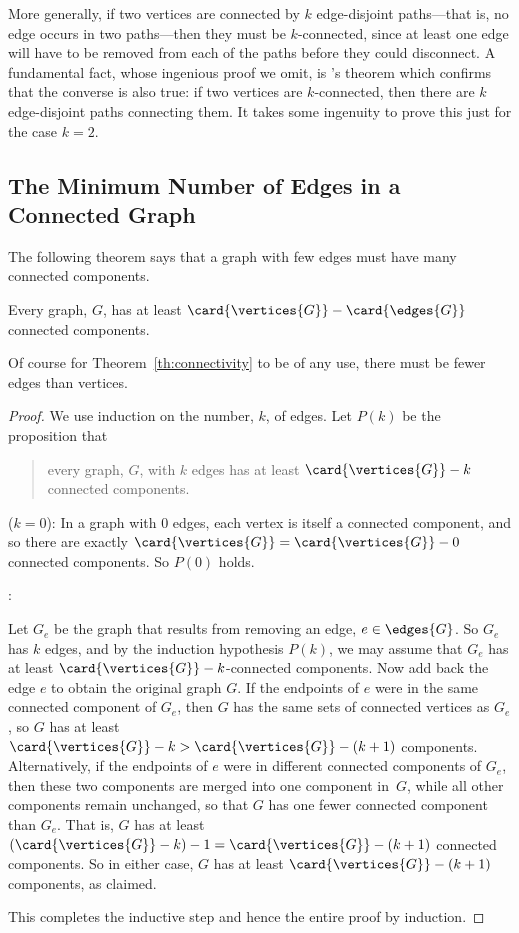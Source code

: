 More generally, if two vertices are connected by $k$ edge-disjoint
paths---that is, no edge occurs in two paths---then they must
be $k$-connected, since at least one edge will have to be removed from
each of the paths before they could disconnect.  A fundamental fact,
whose ingenious proof we omit, is 's theorem which
confirms that the converse is also true: if two vertices are
$k$-connected, then there are $k$ edge-disjoint paths connecting them.
It takes some ingenuity to prove this just for the case $k=2$.

\subsection{The Minimum Number of Edges in a Connected Graph}

The following theorem says that a graph with few edges must have many
connected components.
\begin{theorem}\label{th:connectivity}
Every graph, $G$, has at least $\card{\vertices{G}} - \card{\edges{G}}$
connected components.
\end{theorem}
Of course for Theorem~\ref{th:connectivity} to be of any use, there must
be fewer edges than vertices.

\begin{proof}
We use induction on the number, $k$, of edges.  Let $P(k)$ be the
proposition that
\begin{quote}
every graph, $G$, with $k$ edges has at least $\card{\vertices{G}}-k$
connected components.
\end{quote}

 ($k=0$): In a graph with 0 edges, each
vertex is itself a connected component, and so there are exactly
$\card{\vertices{G}} = \card{\vertices{G}} - 0$ connected components.
So $P(0)$ holds.

:

\iffalse
Now we assume that the induction hypothesis holds for every $k$-edge
graph in order to prove that it holds for every $(k+1)$-edge graph,
where $k \geq 0$.
\fi

Let $G_e$ be the graph that results from removing an edge, $e \in
\edges{G}$.  So $G_e$ has $k$ edges, and by the induction hypothesis
$P(k)$, we may assume that $G_e$ has at least $\card{\vertices{G}} -
k$-connected components.  Now add back the edge $e$ to obtain the
original graph $G$.  If the endpoints of $e$ were in the same
connected component of $G_e$, then $G$ has the same sets of connected
vertices as $G_e$, so $G$ has at least $\card{\vertices{G}} - k >
\card{\vertices{G}} - (k+1)$ components.  Alternatively, if the
endpoints of $e$ were in different connected components of $G_e$, then
these two components are merged into one component in~$G$, while all
other components remain unchanged, so that $G$ has one fewer connected
component than $G_e$.  That is, $G$ has at least $(\card{\vertices{G}}
- k) - 1 = \card{\vertices{G}} - (k+1)$ connected components.  So in
either case, $G$ has at least $\card{\vertices{G}} - (k+1)$
components, as claimed.

This completes the inductive step and hence the entire proof by
induction.
\end{proof}

